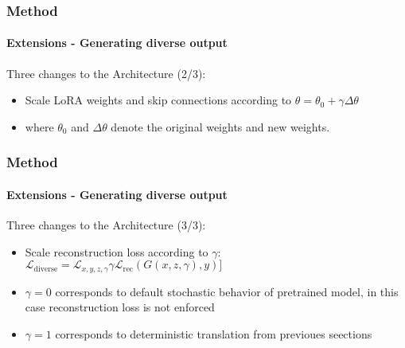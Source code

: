 \begin{frame}
    \frametitle{Method}
    \framesubtitle{Extensions - Generating diverse output}
    Three changes to the Architecture (2/3):
    \begin {itemize}
        \item Scale LoRA weights and skip connections according to $\theta = \theta_0 + \gamma \Delta \theta$  
        \item where $\theta_0$ and $\Delta \theta$ denote the original weights and new weights.
    \end{itemize}
\end{frame}


\begin{frame}
    \frametitle{Method}
    \framesubtitle{Extensions - Generating diverse output}
    Three changes to the Architecture (3/3):
    \begin {itemize}
        \item Scale reconstruction loss according to $\gamma$: $\mathcal{L}_{\text{diverse}} = \mathcal{L}_{x,y,z,\gamma} \gamma\mathcal{L}_{\text{rec}}(G(x,z,\gamma),y)]$
        \item $\gamma = 0$ corresponds to default stochastic behavior of pretrained model, in this case reconstruction loss is not enforced
        \item $\gamma = 1$ corresponds to deterministic translation from previoues seections
    \end{itemize}
\end{frame}
